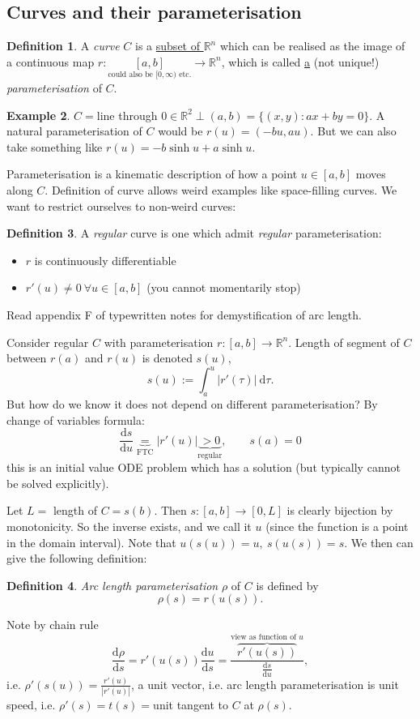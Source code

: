 \documentclass[a4paper]{article}
\theoremstyle{definition}
\newtheorem{defn}{Definition}[subsection]
\newtheorem{eg}[defn]{Example}
\begin{document}
\subsection{Curves and their parameterisation}
\begin{defn}
A \textit{curve} $C$ is a \underline{subset of $\mathbb R^n$} which can be realised as the image of a continuous map $r:\underset{\text{could also be }[0,\infty)\text{ etc.}}{[a,b]}\rightarrow \mathbb R^n$, which is called \underline{a} (not unique!) \textit{parameterisation} of $C$.
\end{defn}

\begin{eg}
$C=$line through $0\in \mathbb R^2 \perp (a,b) = \{(x,y):ax+by=0\}$. A natural parameterisation of $C$ would be $r(u)=(-bu,au)$. But we can also take something like $r(u) = -b \sinh u + a\sinh u$.
\end{eg}
Parameterisation is a kinematic description of how a point $u\in [a,b]$ moves along $C$. Definition of curve allows weird examples like space-filling curves. We want to restrict ourselves to non-weird curves:
\begin{defn}
A \textit{regular} curve is one which admit \textit{regular} parameterisation:
\begin{itemize}
    \item $r$ is continuously differentiable
    \item $r'(u)\neq 0 \ \forall u\in [a,b]$ \qquad (you cannot momentarily stop)
\end{itemize}
\end{defn}

Read appendix F of typewritten notes for demystification of arc length.

Consider regular $C$ with parameterisation $r:[a,b]\rightarrow \mathbb R^n$. Length of segment of $C$ between $r(a)$ and $r(u)$ is denoted $s(u)$,
\[
s(u) := \int_a^u |r'(\tau)| \ \mathrm d \tau .
\]
But how do we know it does not depend on different parameterisation? By change of variables formula:
\[
\frac{\mathrm d s}{\mathrm d u} \underbrace{=}_{\text{FTC}} |r'(u)|\underbrace{>0}_{\text{regular}},\qquad s(a)=0
\]
this is an initial value ODE problem which has a solution (but typically cannot be solved explicitly).

Let $L=$ length of $C=s(b)$. Then $s:[a,b]\rightarrow [0,L]$ is clearly bijection by monotonicity. So the inverse exists, and we call it $u$ (since the function is a point in the domain interval). Note that $u(s(u))=u,\ s(u(s))=s.$ We then can give the following definition:
\begin{defn}
\textit{Arc length parameterisation} $\rho$ of $C$ is defined by
\[
\rho (s) = r(u(s)).
\]
\end{defn}
Note by chain rule
\[
\frac{\mathrm d \rho}{\mathrm d s} = r'(u(s)) \frac{\mathrm d u}{\mathrm d s} = \frac{\overbrace{r'(u(s))}^{\text{view as function of }u}}{\frac{\mathrm d s}{\mathrm d u}},
\]
i.e. $\rho'(s(u))=\frac{r'(u)}{|r'(u)|}$, a unit vector, i.e. arc length parameterisation is unit speed, i.e. $\rho'(s)=t(s)=$unit tangent to $C$ at $\rho(s)$.
\end{document}
